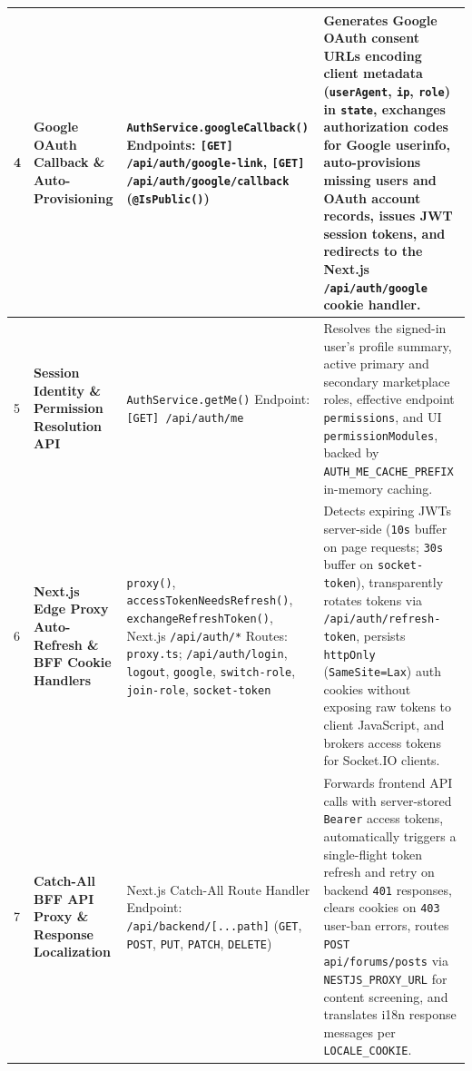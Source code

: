 \begin{longtable}{|C{0.7cm}|L{3.2cm}|S{5.4cm}|p{5.8cm}|}
4 &
\textbf{Google OAuth Callback \& Auto-Provisioning} &
\texttt{AuthService.\allowbreak{}googleCallback()} \newline
Endpoints: \texttt{[GET] /api/\allowbreak{}auth/\allowbreak{}google-link}, \texttt{[GET] /api/\allowbreak{}auth/\allowbreak{}google/\allowbreak{}callback} (\texttt{@IsPublic()}) &
Generates Google OAuth consent URLs encoding client metadata (\texttt{userAgent}, \texttt{ip}, \texttt{role}) in \texttt{state}, exchanges authorization codes for Google userinfo, auto-provisions missing users and OAuth account records, issues JWT session tokens, and redirects to the Next.js \texttt{/api/auth/google} cookie handler.
\\ \hline

5 &
\textbf{Session Identity \& Permission Resolution API} &
\texttt{AuthService.\allowbreak{}getMe()} \newline
Endpoint: \texttt{[GET] /api/\allowbreak{}auth/me} &
Resolves the signed-in user's profile summary, active primary and secondary marketplace roles, effective endpoint \texttt{permissions}, and UI \texttt{permissionModules}, backed by \texttt{AUTH\_ME\_\allowbreak{}CACHE\_PREFIX} in-memory caching.
\\ \hline

6 &
\textbf{Next.js Edge Proxy Auto-Refresh \& BFF Cookie Handlers} &
\texttt{proxy()}, \texttt{accessTokenNeedsRefresh()}, \texttt{exchangeRefreshToken()}, Next.js \texttt{/api/auth/*} \newline
Routes: \texttt{proxy.ts}; \texttt{/api/auth/\allowbreak{}login}, \texttt{logout}, \texttt{google}, \texttt{switch-role}, \texttt{join-role}, \texttt{socket-token} &
Detects expiring JWTs server-side (\texttt{10s} buffer on page requests; \texttt{30s} buffer on \texttt{socket-token}), transparently rotates tokens via \texttt{/api/auth/refresh-token}, persists \texttt{httpOnly} (\texttt{SameSite=Lax}) auth cookies without exposing raw tokens to client JavaScript, and brokers access tokens for Socket.IO clients.
\\ \hline

7 &
\textbf{Catch-All BFF API Proxy \& Response Localization} &
Next.js Catch-All Route Handler \newline
Endpoint: \texttt{/api/backend/\allowbreak{}[...path]} (\texttt{GET}, \texttt{POST}, \texttt{PUT}, \texttt{PATCH}, \texttt{DELETE}) &
Forwards frontend API calls with server-stored \texttt{Bearer} access tokens, automatically triggers a single-flight token refresh and retry on backend \texttt{401} responses, clears cookies on \texttt{403} user-ban errors, routes \texttt{POST api/forums/posts} via \texttt{NESTJS\_\allowbreak{}PROXY\_URL} for content screening, and translates i18n response messages per \texttt{LOCALE\_COOKIE}.
\\ \hline


\end{longtable}
